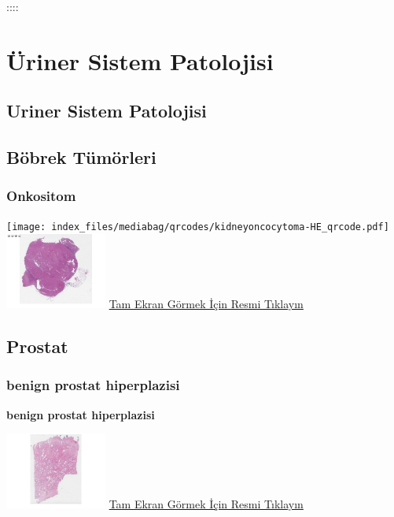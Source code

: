 \documentclass[
  letterpaper,
  DIV=11,
  numbers=noendperiod]{scrreprt}
\begin{document}
::::

\part{Üriner Sistem Patolojisi}

\hypertarget{sec-uriner-sistem-patolojisi}{%
\chapter{Uriner Sistem Patolojisi}\label{sec-uriner-sistem-patolojisi}}

\hypertarget{sec-bobrek-tumorleri}{%
\chapter{Böbrek Tümörleri}\label{sec-bobrek-tumorleri}}

\hypertarget{sec-bobrek-onkositom}{%
\section{Onkositom}\label{sec-bobrek-onkositom}}

\texttt{[image: index\_files/mediabag/qrcodes/kidneyoncocytoma-HE\_qrcode.pdf]}
\href{https://images.patolojiatlasi.com/kidneyoncocytoma/HE.html}{\includegraphics[width=0.25\textwidth,height=\textheight]{./screenshots/thumbnail_kidneyoncocytoma.png}}
\href{https://images.patolojiatlasi.com/kidneyoncocytoma/HE.html}{Tam
Ekran Görmek İçin Resmi Tıklayın}

\hypertarget{sec-prostat}{%
\chapter{Prostat}\label{sec-prostat}}

\hypertarget{sec-benign-prostat-hiperplazisi}{%
\section{benign prostat
hiperplazisi}\label{sec-benign-prostat-hiperplazisi}}

\textbf{benign prostat hiperplazisi}

\href{https://images.patolojiatlasi.com/benign-prostate-hyperplasia/HE.html}{\includegraphics[width=0.25\textwidth,height=\textheight]{./screenshots/thumbnail_benign-prostate-hyperplasia.png}}
\href{https://images.patolojiatlasi.com/benign-prostate-hyperplasia/HE.html}{Tam
Ekran Görmek İçin Resmi Tıklayın}
\end{document}
